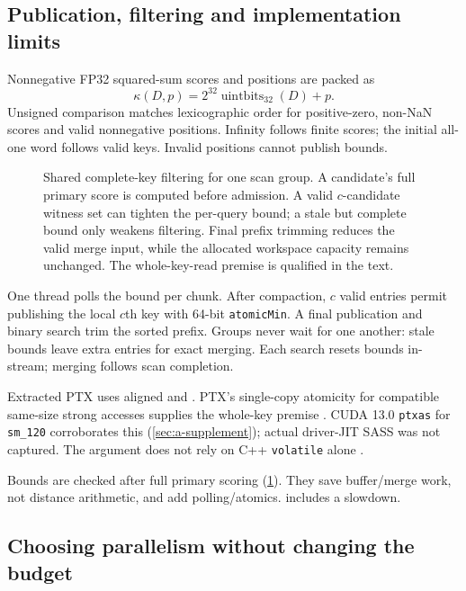 \subsection{Publication, filtering and implementation limits}

Nonnegative FP32 squared-sum scores and positions are packed as
\begin{equation}
 \kappa(D,p)=2^{32}\operatorname{uintbits}_{32}(D)+p.
 \label{eq:5-packed-key}
\end{equation}
Unsigned comparison matches lexicographic order for positive-zero, non-NaN scores and valid nonnegative positions. Infinity follows finite scores; the initial all-one word follows valid keys. Invalid positions cannot publish bounds.

\begin{figure}[tbp]
\centering

\caption[Shared complete-key filtering]{Shared complete-key filtering for one scan group. A candidate's
full primary score is computed before admission. A valid $c$-candidate
witness set can tighten the per-query bound; a stale but complete bound
only weakens filtering. Final prefix trimming reduces the valid merge
input, while the allocated workspace capacity remains unchanged.
The whole-key-read premise is qualified in the text.}
\label{fig:5-shared-bound}
\end{figure}

One thread polls the bound per chunk. After compaction, $c$ valid entries permit publishing the local $c$th key with 64-bit \texttt{atomicMin}. A final publication and binary search trim the sorted prefix. Groups never wait for one another: stale bounds leave extra entries for exact merging. Each search resets bounds in-stream; merging follows scan completion.

Extracted PTX uses aligned  and . PTX's single-copy atomicity for compatible same-size strong accesses supplies the whole-key premise \cite{ptx_isa}. CUDA 13.0 \texttt{ptxas} for \texttt{sm\_120} corroborates this (\cref{sec:a-supplement}); actual driver-JIT SASS was not captured. The argument does not rely on C++ \texttt{volatile} alone \cite{cuda_programming_guide}.

Bounds are checked after full primary scoring (\cref{fig:5-shared-bound}). They save buffer/merge work, not distance arithmetic, and add polling/atomics.  includes a slowdown.

\subsection{Choosing parallelism without changing the budget}

